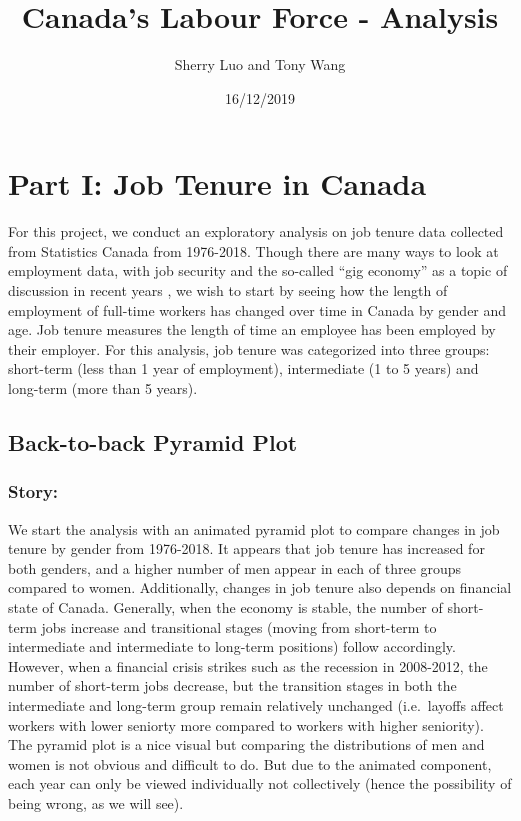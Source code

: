 \documentclass[]{article}
\title{Canada's Labour Force - Analysis}
\author{Sherry Luo and Tony Wang}
\date{16/12/2019}
\begin{document}
\maketitle

\hypertarget{part-i-job-tenure-in-canada}{%
\section{Part I: Job Tenure in
Canada}\label{part-i-job-tenure-in-canada}}

For this project, we conduct an exploratory analysis on job tenure data
collected from Statistics Canada from 1976-2018. Though there are many
ways to look at employment data, with job security and the so-called
``gig economy'' as a topic of discussion in recent years
\cite{NBERw22667}, we wish to start by seeing how the length of
employment of full-time workers has changed over time in Canada by
gender and age. Job tenure measures the length of time an employee has
been employed by their employer. For this analysis, job tenure was
categorized into three groups: short-term (less than 1 year of
employment), intermediate (1 to 5 years) and long-term (more than 5
years).

\hypertarget{back-to-back-pyramid-plot}{%
\subsection{Back-to-back Pyramid Plot}\label{back-to-back-pyramid-plot}}

\hypertarget{story}{%
\subsubsection{Story:}\label{story}}

We start the analysis with an animated pyramid plot to compare changes
in job tenure by gender from 1976-2018. It appears that job tenure has
increased for both genders, and a higher number of men appear in each of
three groups compared to women. Additionally, changes in job tenure also
depends on financial state of Canada. Generally, when the economy is
stable, the number of short-term jobs increase and transitional stages
(moving from short-term to intermediate and intermediate to long-term
positions) follow accordingly. However, when a financial crisis strikes
such as the recession in 2008-2012, the number of short-term jobs
decrease, but the transition stages in both the intermediate and
long-term group remain relatively unchanged (i.e.~layoffs affect workers
with lower seniorty more compared to workers with higher seniority). The
pyramid plot is a nice visual but comparing the distributions of men and
women is not obvious and difficult to do. But due to the animated
component, each year can only be viewed individually not collectively
(hence the possibility of being wrong, as we will see).
\end{document}
